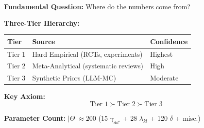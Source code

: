 \begin{tcolorbox}[colback=yellow!10!white, colframe=yellow!75!black,
    title=\textbf{Quick Reference}]

\textbf{Fundamental Question:} Where do the numbers come from?

\textbf{Three-Tier Hierarchy:}
\begin{center}
\small
\begin{tabular}{@{}lll@{}}
\toprule
\textbf{Tier} & \textbf{Source} & \textbf{Confidence} \\
\midrule
Tier 1 & Hard Empirical (RCTs, experiments) & Highest \\
Tier 2 & Meta-Analytical (systematic reviews) & High \\
Tier 3 & Synthetic Priors (LLM-MC) & Moderate \\
\bottomrule
\end{tabular}
\end{center}

\textbf{Key Axiom:}
\begin{equation}
\boxed{\text{Tier 1} \succ \text{Tier 2} \succ \text{Tier 3}}
\label{eq:BBB-priority}
\end{equation}

\textbf{Parameter Count:} $|\Theta| \approx 200$ (15 $\gamma_{dd'}$ + 28 $\lambda_{kl}$ + 120 $\delta$ + misc.)

\end{tcolorbox}


